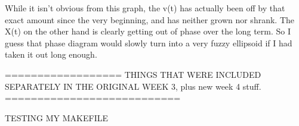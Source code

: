 \documentclass{article}
\begin{document}
While it isn't obvious from this graph, the v(t) has actually been off by that exact amount since the very beginning, and has neither grown nor shrank. The X(t) on the other hand is clearly getting out of phase over the long term. So I guess that phase diagram would slowly turn into a very fuzzy ellipsoid if I had taken it out long enough.

\bigskip


================== THINGS THAT WERE INCLUDED SEPARATELY IN THE ORIGINAL WEEK 3, plus new week 4 stuff.  ===========================

TESTING MY MAKEFILE
\end{document}
